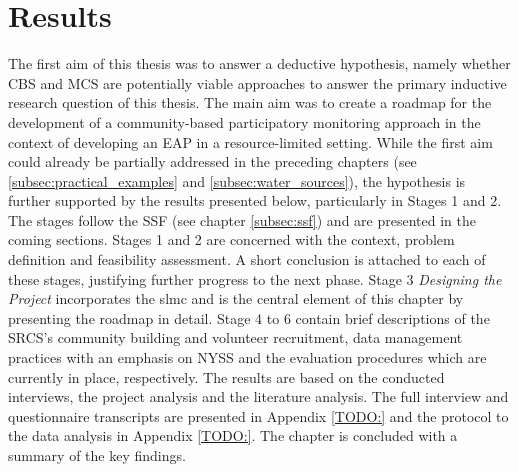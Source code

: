 
\chapter{Results} %

\label{chapter4}



The first aim of this thesis was to answer a deductive hypothesis, namely whether CBS and MCS are potentially viable approaches to answer the primary inductive research question of this thesis. The main aim was to create a roadmap for the development of a community-based participatory monitoring approach in the context of developing an EAP in a resource-limited setting. While the first aim could already be partially addressed in the preceding chapters (see \ref*{subsec:practical_examples} and \ref*{subsec:water_sources}), the hypothesis is further supported by the results presented below, particularly in Stages 1 and 2. %
The stages follow the SSF (see chapter \ref*{subsec:ssf}) and are presented in the coming sections. Stages 1 and 2 are concerned with the context, problem definition and feasibility assessment. A short conclusion is attached to each of these stages, justifying further progress to the next phase. Stage 3 \textit{Designing the Project} incorporates the \acrshort*{slmc} and is the central element of this chapter by presenting the roadmap in detail. Stage 4 to 6 contain brief descriptions of the SRCS's community building and volunteer recruitment, data management practices with an emphasis on NYSS and the evaluation procedures which are currently in place, respectively. The results are based on the conducted interviews, the project analysis and the literature analysis. The full interview and questionnaire transcripts are presented in Appendix \ref*{TODO:} and the protocol to the data analysis in Appendix \ref*{TODO:}. The chapter is concluded with a summary of the key findings.

